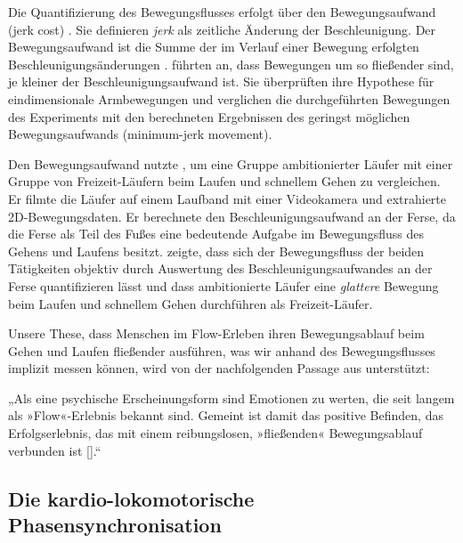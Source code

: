 Die Quantifizierung des Bewegungsflusses erfolgt über den Bewegungsaufwand (jerk cost) \citep{Nelson1983, Hogan1984, Flash1985}. Sie definieren \emph{jerk} als zeitliche Änderung der Beschleunigung. Der Bewegungsaufwand ist die Summe der im Verlauf einer Bewegung erfolgten Beschleunigungsänderungen \citep{Schneider1990}. \citet[][S.~1698]{Flash1985} führten an, dass Bewegungen um so fließender sind, je kleiner der Beschleunigungsaufwand ist. Sie überprüften ihre Hypothese für eindimensionale Armbewegungen und verglichen die durchgeführten Bewegungen des Experiments mit den berechneten Ergebnissen des geringst möglichen Bewegungsaufwands (minimum-jerk movement).

Den Bewegungsaufwand nutzte \citet{Hreljac2000}, um eine Gruppe ambitionierter Läufer mit einer Gruppe von Freizeit-Läufern beim Laufen und schnellem Gehen zu vergleichen. Er filmte die Läufer auf einem Laufband mit einer Videokamera und extrahierte 2D-Bewegungsdaten. Er berechnete den Beschleunigungsaufwand an der Ferse, da die Ferse als Teil des Fußes eine bedeutende Aufgabe im Bewegungsfluss des Gehens und Laufens besitzt. \citet{Hreljac2000} zeigte, dass sich der Bewegungsfluss der beiden Tätigkeiten objektiv durch Auswertung des Beschleunigungsaufwandes an der Ferse quantifizieren lässt und dass ambitionierte Läufer eine \emph{glattere} Bewegung beim Laufen und schnellem Gehen durchführen als Freizeit-Läufer.

Unsere These, dass Menschen im Flow-Erleben ihren Bewegungsablauf beim Gehen und Laufen fließender ausführen, was wir anhand des Bewegungsflusses implizit messen können, wird von der nachfolgenden Passage aus \citet[][S.~121]{Meinel2007} unterstützt:

„Als eine psychische Erscheinungsform sind Emotionen zu werten, die seit langem als »Flow«-Erlebnis bekannt sind. Gemeint ist damit das positive Befinden, das Erfolgserlebnis, das mit einem reibungslosen, »fließenden« Bewegungsablauf verbunden ist [\textellipsis].“

\subsection{Die kardio-lokomotorische Phasensynchronisation} 

\label{ssub:die_kardio_lokomotorische_phasensynchronisation}

